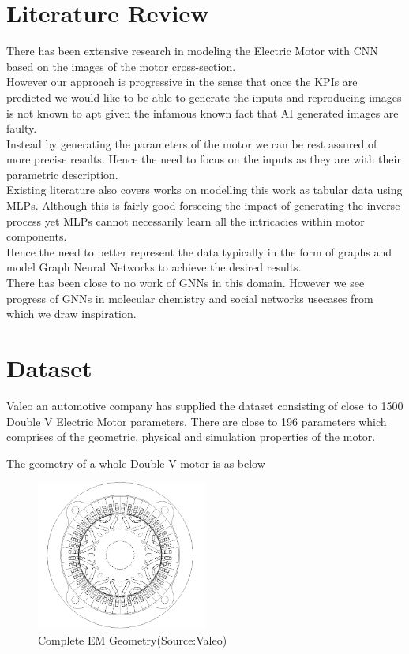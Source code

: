 \documentclass{report} %
\begin{document}
\chapter*{Literature Review} 
There has been extensive research in modeling the Electric Motor with \ac{CNN} based on the images of the motor cross-section. \\
However our approach is progressive in the sense that once the \ac{KPI}s are predicted we would like to be able to generate the inputs and reproducing images is not known to apt given the infamous known fact that AI generated images are faulty.\\
Instead by generating the parameters of the motor we can be rest assured of more precise results. 
Hence the need to focus on the inputs as they are with their parametric description.\\
Existing literature also covers works on modelling this work as tabular data using \ac{MLP}s. 
Although this is fairly good forseeing the impact of generating the inverse process yet \ac{MLP}s cannot necessarily learn all the intricacies within motor components. \\
Hence the need to better represent the data typically in the form of graphs and model Graph Neural Networks to achieve the desired results. \\
There has been close to no work of \ac{GNN}s in this domain. However we see progress of \ac{GNN}s in molecular chemistry and social networks usecases from which we draw inspiration.\\

\newpage 

\chapter*{Dataset} 
Valeo an automotive company has supplied the dataset consisting of close to 1500 Double V Electric Motor parameters. 
There are close to 196 parameters which comprises of the geometric, physical and simulation properties of the motor.

The geometry of a whole Double V motor is as below

\begin{figure}[H]
    \centering
    \includegraphics[width=0.5\textwidth]{./ReportImages/FullMotorv2.png} 
    \caption{Complete EM Geometry(Source:Valeo)}
    \label{fig:Full Motor}
\end{figure}
\end{document}
